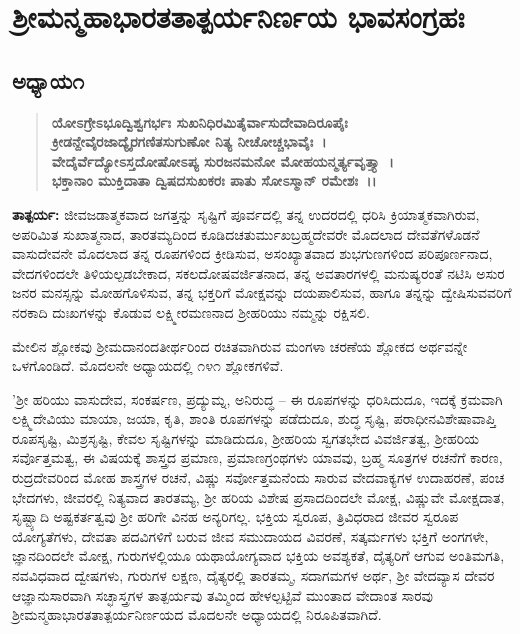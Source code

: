 

\begin{center}
\end{center}

\begin{center}
\end{center}

\chapter{ ಶ‍್ರೀಮನ್ಮಹಾಭಾರತತಾತ್ಪರ್ಯನಿರ್ಣಯ ಭಾವಸಂಗ್ರಹಃ}

\section*{ಅಧ್ಯಾಯ\enginline{-}೧}

\begin{verse}
\textbf{ಯೋಽಗ್ರೇಽಭೂದ್ವಿಶ್ವಗರ್ಭಃ ಸುಖನಿಧಿರಮಿತೈರ್ವಾಸುದೇವಾದಿರೂಪೈಃ }\\\textbf{ಕ್ರೀಡನ್ದೇವೈರಜಾದ್ಯೈರಗಣಿತಸುಗುಣೋ ನಿತ್ಯ ನೀಚೋಚ್ಚಭಾವೈಃ~।} \\\textbf{ವೇದೈರ್ವೆದ್ಯೋಽಸ್ತದೋಷೋಽಪ್ಯ ಸುರಜನಮನೋ ಮೋಹಯನ್ಮರ್ತ್ಯವೃತ್ತ್ಯಾ~।} \\\textbf{ಭಕ್ತಾನಾಂ ಮುಕ್ತಿದಾತಾ ದ್ವಿಷದಸುಖಕರಃ ಪಾತು ಸೋಽಸ್ಮಾನ್ ರಮೇಶಃ~।।}
\end{verse}

\textbf{ತಾತ್ಪರ್ಯ:\enginline{-} }ಜೀವಜಡಾತ್ಮಕವಾದ ಜಗತ್ತನ್ನು ಸೃಷ್ಟಿಗೆ ಪೂರ್ವದಲ್ಲಿ ತನ್ನ ಉದರದಲ್ಲಿ ಧರಿಸಿ ಕ್ರಿಯಾತ್ಮಕವಾಗಿರುವ, ಅಪರಿಮಿತ ಸುಖಾತ್ಮನಾದ, ತಾರತಮ್ಯದಿಂದ ಕೂಡಿದ\break ಚತುರ್ಮುಖಬ್ರಹ್ಮದೇವರೇ ಮೊದಲಾದ ದೇವತೆಗಳೊಡನೆ ವಾಸುದೇವನೇ ಮೊದಲಾದ ತನ್ನ ರೂಪಗಳಿಂದ ಕ್ರೀಡಿಸುವ, ಅಸಂಖ್ಯಾತವಾದ ಶುಭಗುಣಗಳಿಂದ ಪರಿಪೂರ್ಣನಾದ, ವೇದಗಳಿಂದಲೇ ತಿಳಿಯಲ್ಪಡಬೇಕಾದ, ಸಕಲದೋಷವರ್ಜಿತನಾದ, ತನ್ನ ಅವತಾರಗಳಲ್ಲಿ ಮನುಷ್ಯರಂತೆ ನಟಿಸಿ ಅಸುರ ಜನರ ಮನಸ್ಸನ್ನು ಮೋಹಗೊಳಿಸುವ, ತನ್ನ ಭಕ್ತರಿಗೆ ಮೋಕ್ಷವನ್ನು ದಯಪಾಲಿಸುವ, ಹಾಗೂ ತನ್ನನ್ನು ದ್ವೇಷಿಸುವವರಿಗೆ ನರಕಾದಿ ದುಃಖಗಳನ್ನು ಕೊಡುವ ಲಕ್ಷ್ಮೀರಮಣನಾದ ಶ‍್ರೀಹರಿಯು ನಮ್ಮನ್ನು ರಕ್ಷಿಸಲಿ.

ಮೇಲಿನ ಶ್ಲೋಕವು ಶ‍್ರೀಮದಾನಂದತೀರ್ಥರಿಂದ ರಚಿತವಾಗಿರುವ ಮಂಗಳಾ ಚರಣೆಯ ಶ್ಲೋಕದ ಅರ್ಥವನ್ನೇ ಒಳಗೊಂಡಿದೆ. ಮೊದಲನೇ ಅಧ್ಯಾಯದಲ್ಲಿ ೧೪೧ ಶ್ಲೋಕಗಳಿವೆ.

'ಶ‍್ರೀ ಹರಿಯು ವಾಸುದೇವ, ಸಂಕರ್ಷಣ, ಪ್ರದ್ಯುಮ್ನ, ಅನಿರುದ್ಧ – ಈ ರೂಪಗಳನ್ನು ಧರಿಸಿದುದೂ, ಇದಕ್ಕೆ ಕ್ರಮವಾಗಿ ಲಕ್ಷ್ಮಿದೇವಿಯು ಮಾಯಾ, ಜಯಾ, ಕೃತಿ, ಶಾಂತಿ ರೂಪಗಳನ್ನು ಪಡೆದುದೂ, ಶುದ್ಧ ಸೃಷ್ಟಿ, ಪರಾಧೀನವಿಶೇಷಾವಾಪ್ತಿ ರೂಪಸೃಷ್ಟಿ, ಮಿಶ್ರಸೃಷ್ಟಿ, ಕೇವಲ ಸೃಷ್ಟಿಗಳನ್ನು ಮಾಡಿದುದೂ, ಶ‍್ರೀಹರಿಯ ಸ್ವಗತಭೇದ ವಿವರ್ಜಿತತ್ವ, ಶ‍್ರೀಹರಿಯ ಸರ್ವೊತ್ತಮತ್ವ, ಈ ವಿಷಯಕ್ಕೆ ಶಾಸ್ತ್ರದ ಪ್ರಮಾಣ, ಪ್ರಮಾಣಗ್ರಂಥಗಳು ಯಾವವು, ಬ್ರಹ್ಮ ಸೂತ್ರಗಳ ರಚನೆಗೆ ಕಾರಣ, ರುದ್ರದೇವರಿಂದ ಮೋಹ ಶಾಸ್ತ್ರಗಳ ರಚನೆ, ವಿಷ್ಣು ಸರ್ವೋತ್ತಮನೆಂದು ಸಾರುವ ವೇದವಾಕ್ಯಗಳ ಉದಾಹರಣೆ, ಪಂಚ ಭೇದಗಳು, ಜೀವರಲ್ಲಿ ನಿತ್ಯವಾದ ತಾರತಮ್ಯ, ಶ‍್ರೀ ಹರಿಯ ವಿಶೇಷ ಪ್ರಸಾದದಿಂದಲೇ ಮೋಕ್ಷ, ವಿಷ್ಣುವೇ ಮೋಕ್ಷದಾತ, ಸೃಷ್ಟ್ಯಾದಿ ಅಷ್ಟಕರ್ತತ್ವವು ಶ‍್ರೀ ಹರಿಗೇ ವಿನಹ ಅನ್ಯರಿಗಲ್ಲ. ಭಕ್ತಿಯ ಸ್ವರೂಪ, ತ್ರಿವಿಧರಾದ ಜೀವರ ಸ್ವರೂಪ ಯೋಗ್ಯತೆಗಳು, ದೇವತಾ ಪದವಿಗಳಿಗೆ ಬರುವ ಜೀವ ಸಮುದಾಯದ ವಿವರಣೆ, ಸತ್ಕರ್ಮಗಳು ಭಕ್ತಿಗೆ ಅಂಗಗಳೇ, ಜ್ಞಾನದಿಂದಲೇ ಮೋಕ್ಷ, ಗುರುಗಳಲ್ಲಿಯೂ ಯಥಾಯೋಗ್ಯವಾದ ಭಕ್ತಿಯ ಅವಶ್ಯಕತೆ, ದೈತ್ಯರಿಗೆ ಆಗುವ ಅಂತಿಮಗತಿ, ನವವಿಧವಾದ ದ್ವೇಷಗಳು, ಗುರುಗಳ ಲಕ್ಷಣ, ದೈತ್ಯರಲ್ಲಿ ತಾರತಮ್ಮ, ಸದಾಗಮಗಳ ಅರ್ಥ, ಶ‍್ರೀ ವೇದವ್ಯಾಸ ದೇವರ ಆಜ್ಞಾನುಸಾರವಾಗಿ ಸಚ್ಛಾಸ್ತ್ರಗಳ ತಾತ್ಪರ್ಯವು ತಮ್ಮಿಂದ ಹೇಳಲ್ಪಟ್ಟಿವೆ ಮುಂತಾದ ವೇದಾಂತ ಸಾರವು ಶ‍್ರೀಮನ್ಮಹಾಭಾರತತಾತ್ಪರ್ಯನಿರ್ಣಯದ ಮೊದಲನೇ ಅಧ್ಯಾಯದಲ್ಲಿ ನಿರೂಪಿತ\-ವಾಗಿದೆ.


